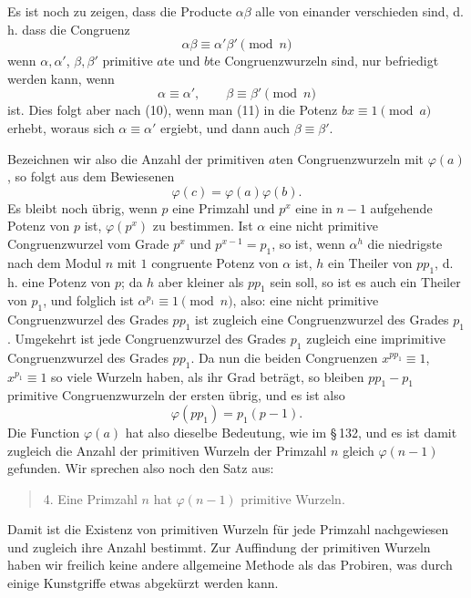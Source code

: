 \documentclass[11pt]{article}
\begin{document}
Es ist noch zu zeigen, dass die Producte $\alpha\beta$ alle von einander verschieden sind, d. h. dass die Congruenz
\[
\tag{11}       \alpha\beta\equiv\alpha'\beta'\pmod n
\]
wenn $\alpha,\alpha'$, $\beta,\beta'$ primitive $a$te und $b$te Congruenzwurzeln sind, nur befriedigt werden kann, wenn
\[
        \alpha\equiv\alpha',\qquad \beta\equiv\beta'\pmod n
\]
ist. Dies folgt aber nach (10), wenn man (11) in die Potenz $bx\equiv1\pmod a$ erhebt, woraus sich $\alpha\equiv\alpha'$ ergiebt, und dann auch $\beta\equiv\beta'$.

Bezeichnen wir also die Anzahl der primitiven $a$ten Congruenzwurzeln mit $\varphi(a)$, so folgt aus dem Bewiesenen
\[
\tag{12}       \varphi(c)=\varphi(a)\varphi(b).
\]
Es bleibt noch übrig, wenn $p$ eine Primzahl und $p^x$ eine in $n-1$ aufgehende Potenz von $p$ ist, $\varphi(p^x)$ zu bestimmen. Ist $\alpha$ eine nicht primitive Congruenzwurzel vom Grade $p^x$ und $p^{x-1}=p_1$, so ist, wenn $\alpha^h$ die niedrigste nach dem Modul $n$ mit $1$ congruente Potenz von $\alpha$ ist, $h$ ein Theiler von $pp_1$, d. h. eine Potenz von $p$; da $h$ aber kleiner als $pp_1$ sein soll, so ist es auch ein Theiler von $p_1$, und folglich ist $\alpha^{p_1}\equiv1\pmod n$, also: eine nicht primitive Congruenzwurzel des Grades $pp_1$ ist zugleich eine Congruenzwurzel des Grades $p_1$. Umgekehrt ist jede Congruenzwurzel des Grades $p_1$ zugleich eine imprimitive Congruenzwurzel des Grades $pp_1$. Da nun die beiden Congruenzen $x^{pp_1}\equiv1$, $x^{p_1}\equiv1$ so viele Wurzeln haben, als ihr Grad beträgt, so bleiben $pp_1-p_1$ primitive Congruenzwurzeln der ersten übrig, und es ist also
\[
\tag{13}       \varphi(pp_1)=p_1(p-1).
\]
Die Function $\varphi(a)$ hat also dieselbe Bedeutung, wie im \S\,132, und es ist damit zugleich die Anzahl der primitiven Wurzeln der Primzahl $n$ gleich $\varphi(n-1)$ gefunden. Wir sprechen also noch den Satz aus:
\begin{quote}
4. Eine Primzahl $n$ hat $\varphi(n-1)$ primitive Wurzeln.
\end{quote}
Damit ist die Existenz von primitiven Wurzeln für jede Primzahl nachgewiesen und zugleich ihre Anzahl bestimmt. Zur Auffindung der primitiven Wurzeln haben wir freilich keine andere allgemeine Methode als das Probiren, was durch einige Kunstgriffe etwas abgekürzt werden kann.
\end{document}
